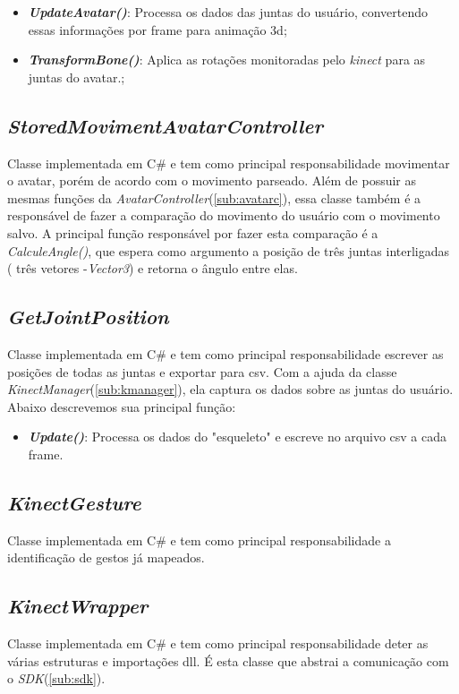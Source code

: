   \begin{itemize}
      \item \textit{\textbf{UpdateAvatar()}}: Processa os dados das juntas do usuário, convertendo essas informações por frame para animação 3d;
      \item \textit{\textbf{TransformBone()}}: Aplica as rotações monitoradas pelo \textit{kinect} para as juntas do avatar.;

  \end{itemize}

  \subsection{\textit{StoredMovimentAvatarController}}\label{sub:storedavatarc}
    Classe implementada em C\# e tem como principal responsabilidade movimentar o avatar, porém de acordo com o movimento parseado. Além de possuir as mesmas funções da
  \textit{AvatarController}(\ref{sub:avatarc}), essa classe também é a responsável de fazer a comparação do movimento do usuário com o movimento salvo. A principal função
  responsável por fazer esta comparação é a \textit{CalculeAngle()}, que espera como argumento a posição de três juntas interligadas ( três vetores -\textit{Vector3}) e retorna o ângulo entre elas.

  \subsection{\textit{GetJointPosition}}\label{sub:getjoint}
    Classe implementada em C\# e tem como principal responsabilidade escrever as posições de todas as juntas e exportar para csv. Com a ajuda da classe \textit{KinectManager}(\ref{sub:kmanager}),
    ela captura os dados sobre as juntas do usuário. Abaixo descrevemos sua principal função:

    \begin{itemize}
        \item \textit{\textbf{Update()}}: Processa os dados do "esqueleto" e escreve no arquivo csv a cada frame.
    \end{itemize}

  \subsection{\textit{KinectGesture}}\label{sub:kgesture}
    Classe implementada em C\# e tem como principal responsabilidade a identificação de gestos já mapeados.

  \subsection{\textit{KinectWrapper}}\label{sub:kwrapper}
    Classe implementada em C\# e tem como principal responsabilidade deter as várias estruturas e importações dll. É esta classe que abstrai a comunicação com o
    \textit{SDK}(\ref{sub:sdk}).

